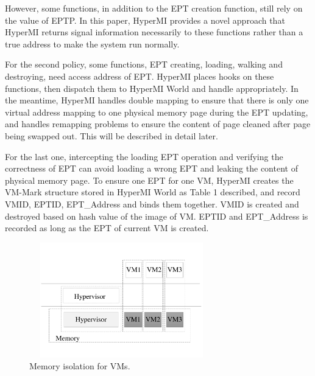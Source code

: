 \documentclass[conference]{IEEEtran}
\begin{document}
However, some functions, in addition to the EPT creation function, still rely on the value of EPTP. In this paper, HyperMI provides a novel approach that HyperMI returns signal information necessarily to these functions rather than a true address to make the system run normally. 



For the second policy, some functions, EPT creating, loading, walking and destroying, need access address of EPT. HyperMI places hooks on these functions, then dispatch them to HyperMI World and handle appropriately. In the meantime, HyperMI handles double mapping to ensure that there is only one virtual address mapping to one physical memory page during the EPT updating, and handles remapping problems to ensure the content of page cleaned after page being swapped out. This will be described in detail later.



For the last one, intercepting the loading EPT operation and verifying the correctness of EPT can avoid loading a wrong EPT and leaking the content of physical memory page. To ensure one EPT for one VM, HyperMI creates the VM-Mark structure stored in HyperMI World as Table 1 described, and record VMID, EPTID, EPT\_Address and binds them together. VMID is created and destroyed based on hash value of the image of VM. EPTID and EPT\_Address is recorded as long as the EPT of current VM is created.




\begin{figure}
\centerline{\includegraphics[width=8cm, height=5cm]{pdfvmcs3.pdf}}%
\caption{Memory isolation for VMs.} \label{fig3}
\end{figure}
\end{document}
